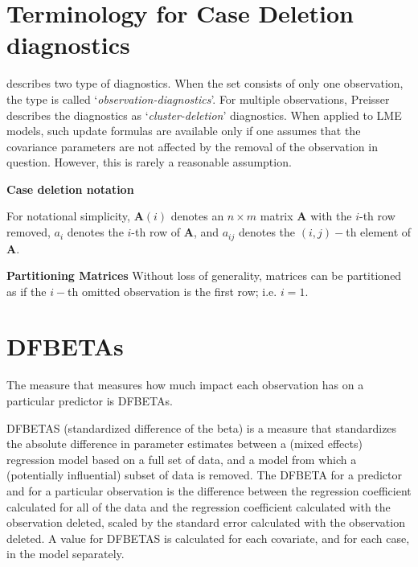 \documentclass[12pt, a4paper]{report}
\theoremstyle{plain}
\theoremstyle{definition}
\theoremstyle{remark}
\begin{document}
	
	
\section{Terminology for Case Deletion diagnostics} %

\citet{preisser} describes two type of diagnostics. When the set consists of only one observation, the type is called
`\textit{observation-diagnostics}'. For multiple observations, Preisser describes the diagnostics as `\textit{cluster-deletion}' diagnostics. When applied to LME models, such update formulas are available only if one assumes that the covariance parameters are not affected by the removal of the observation in question. However, this is rarely a reasonable assumption.

	\noindent \textbf{Case deletion notation} %
	
	For notational simplicity, $\boldsymbol{A}(i)$ denotes an $n \times m$ matrix $\boldsymbol{A}$ with the $i$-th row
	removed, $a_i$ denotes the $i$-th row of $\boldsymbol{A}$, and $a_{ij}$ denotes the $(i, j)-$th element of $\boldsymbol{A}$.
	
	\noindent \textbf{Partitioning Matrices} %
	Without loss of generality, matrices can be partitioned as if the $i-$th omitted observation is the first row; i.e. $i=1$.
	
	




\section{DFBETAs}
The measure that measures how much impact each observation has on a particular predictor is DFBETAs. 


DFBETAS (standardized difference of the beta) is a measure that standardizes the absolute difference in parameter estimates between a (mixed effects) regression model based on a full set of data, and a model from which a (potentially influential) subset of data is removed. The DFBETA for a predictor and for a particular observation is the difference between the regression coefficient calculated for all of the data and the regression coefficient calculated with the observation deleted, scaled by the standard error calculated with the observation deleted. 
A value for DFBETAS is calculated for each covariate, and for each case, in the model separately.
\end{document}
